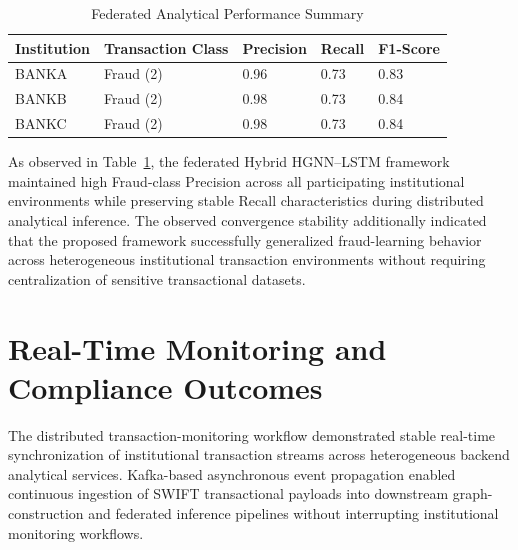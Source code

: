 \begin{table}[H]
\centering
\caption{Federated Analytical Performance Summary}
\vspace{0.2cm}

\renewcommand{\arraystretch}{1.3}

\begin{tabular}{|p{2.2cm}|p{2.2cm}|p{2cm}|p{2cm}|p{2cm}|}
\hline
\textbf{Institution} & \textbf{Transaction Class} & \textbf{Precision} & \textbf{Recall} & \textbf{F1-Score} \\ \hline

BANKA
& Fraud (2)
& 0.96
& 0.73
& 0.83 \\ \hline

BANKB
& Fraud (2)
& 0.98
& 0.73
& 0.84 \\ \hline

BANKC
& Fraud (2)
& 0.98
& 0.73
& 0.84 \\ \hline

\end{tabular}

\renewcommand{\arraystretch}{1}

\label{tab:federated_results}
\end{table}

As observed in Table~\ref{tab:federated_results}, the federated Hybrid HGNN--LSTM framework maintained high Fraud-class Precision across all participating institutional environments while preserving stable Recall characteristics during distributed analytical inference. The observed convergence stability additionally indicated that the proposed framework successfully generalized fraud-learning behavior across heterogeneous institutional transaction environments without requiring centralization of sensitive transactional datasets.

\section[Real-Time Monitoring and Compliance Outcomes]
{\textbf{Real-Time Monitoring and Compliance Outcomes}}

The distributed transaction-monitoring workflow demonstrated stable real-time synchronization of institutional transaction streams across heterogeneous backend analytical services. Kafka-based asynchronous event propagation enabled continuous ingestion of SWIFT transactional payloads into downstream graph-construction and federated inference pipelines without interrupting institutional monitoring workflows.

